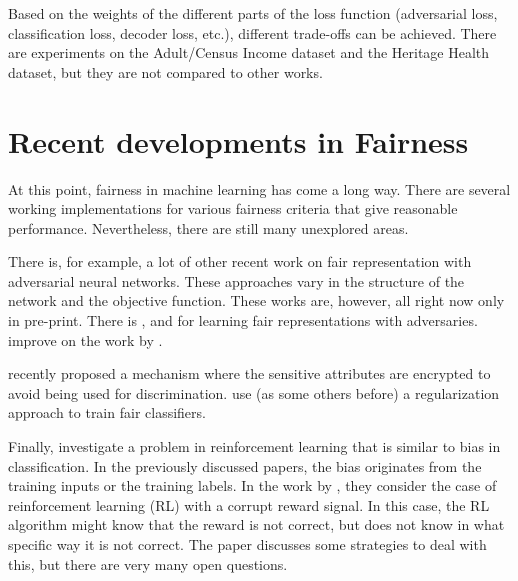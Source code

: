 Based on the weights of the different parts of the loss function (adversarial loss,
classification loss, decoder loss, etc.), different trade-offs can be achieved. There are
experiments on the Adult/Census Income dataset and the Heritage Health dataset, but they
are not compared to other works.

\section{Recent developments in Fairness}\label{recent-developments-in-fairness}
At this point, fairness in machine learning has come a long way.
There are several working implementations for various fairness criteria
that give reasonable performance.
Nevertheless, there are still many unexplored areas.

There is, for example, a lot of other recent work on fair representation
with adversarial neural networks.
These approaches vary in the structure of the network and the objective function.
These works are, however, all right now only in pre-print.
There is \citet{edwards2015censoring}, \citet{beutel2017data}
and \citet{zhang2018mitigating} for learning fair representations with adversaries.
\citet{calmon2017optimized} improve on the work by \citet{zemel2013learning}.

\citet{kilbertus2018blind} recently proposed a mechanism
where the sensitive attributes are encrypted to avoid being used for discrimination.
\citet{bechavod2017penalizing} use (as some others before) a regularization approach to train fair classifiers.

Finally, \citet{everitt2017reinforcement} investigate
a problem in reinforcement learning that is similar to bias in classification.
In the previously discussed papers,
the bias originates from the training inputs or the training labels.
In the work by \citet{everitt2017reinforcement},
they consider the case of reinforcement learning (RL) with a corrupt reward signal.
In this case, the RL algorithm might know that the reward is not correct,
but does not know in what specific way it is not correct.
The paper discusses some strategies to deal with this,
but there are very many open questions.
